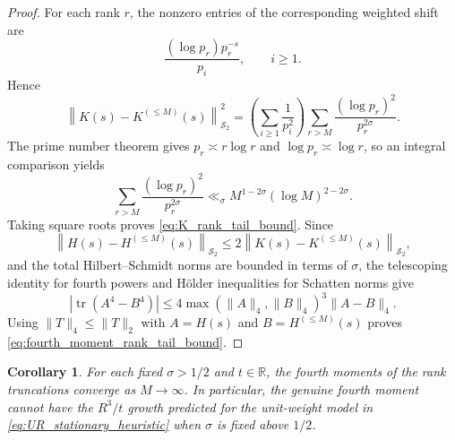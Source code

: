 \documentclass[11pt]{amsart}
\numberwithin{equation}{section}
\theoremstyle{plain}
\newtheorem{corollary}[theorem]{Corollary}
\theoremstyle{definition}
\theoremstyle{remark}
\newcommand{\R}{\mathbb R}
\newcommand{\HS}{\mathcal S_2}
\newcommand{\tr}{\operatorname{tr}}
\begin{document}
\begin{proof}
For each rank $r$, the nonzero entries of the corresponding weighted shift are
\begin{equation}
\frac{(\log p_r)p_r^{-s}}{p_i},
\qquad i\ge1.
\label{eq:single_rank_entries}
\end{equation}
Hence
\begin{equation}
\left\|K(s)-K^{(\le M)}(s)\right\|_{\HS}^2
=
\left(\sum_{i\ge1}\frac1{p_i^2}\right)
\sum_{r>M}\frac{(\log p_r)^2}{p_r^{2\sigma}}.
\label{eq:K_tail_exact_factorization}
\end{equation}
The prime number theorem gives $p_r\asymp r\log r$ and $\log p_r\asymp\log r$, so an integral comparison yields
\begin{equation}
\sum_{r>M}\frac{(\log p_r)^2}{p_r^{2\sigma}}
\ll_{\sigma}
M^{1-2\sigma}(\log M)^{2-2\sigma}.
\label{eq:prime_rank_tail_sum}
\end{equation}
Taking square roots proves \eqref{eq:K_rank_tail_bound}.  Since
\begin{equation}
\left\|H(s)-H^{(\le M)}(s)\right\|_{\HS}
\le
2\left\|K(s)-K^{(\le M)}(s)\right\|_{\HS},
\label{eq:H_tail_from_K_tail}
\end{equation}
and the total Hilbert--Schmidt norms are bounded in terms of $\sigma$, the telescoping identity for fourth powers and H\"older inequalities for Schatten norms give
\begin{equation}
\left|\tr(A^4-B^4)\right|
\le
4\max(\|A\|_4,\|B\|_4)^3\|A-B\|_4.
\label{eq:fourth_power_schatten_bound}
\end{equation}
Using $\|T\|_4\le\|T\|_2$ with $A=H(s)$ and $B=H^{(\le M)}(s)$ proves \eqref{eq:fourth_moment_rank_tail_bound}.
\end{proof}

\begin{corollary}
\label{cor:no_cubic_growth_fixed_sigma}
For each fixed $\sigma>1/2$ and $t\in\R$, the fourth moments of the rank truncations converge as $M\to\infty$.  In particular, the genuine fourth moment cannot have the $R^3/t$ growth predicted for the unit-weight model in \eqref{eq:UR_stationary_heuristic} when $\sigma$ is fixed above $1/2$.
\end{corollary}
\end{document}
